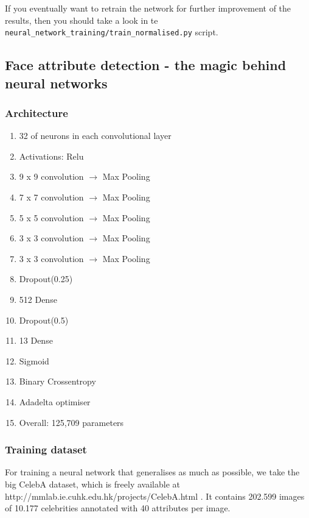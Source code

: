 \documentclass[12.5pt]{scrartcl}
\begin{document}
	If you eventually want to retrain the network for further improvement of the results, then you should take a look in te \texttt{neural\_network\_training/train\_normalised.py} script.
	\subsection{Face attribute detection - the magic behind neural networks}
	\subsubsection{Architecture}
	\begin{enumerate}
		\item 	32 of neurons in each convolutional layer
		\item Activations: Relu
		\item 9 x 9 convolution $\rightarrow$ Max Pooling
		\item	7 x 7 convolution $\rightarrow$  Max Pooling
		\item	5 x 5 convolution $\rightarrow$  Max Pooling
		\item	3 x 3 convolution $\rightarrow$  Max Pooling
		\item	3 x 3 convolution $\rightarrow$  Max Pooling
		\item	Dropout(0.25)
		\item	512 Dense
		\item	Dropout(0.5)
		\item	13 Dense
		\item	Sigmoid
		\item	Binary Crossentropy
		\item	Adadelta optimiser
		\item Overall: 125,709 parameters
	\end{enumerate}
	\subsubsection{Training dataset}
	For training a neural network that generalises as much as possible, we take the big CelebA dataset, which is freely available at http://mmlab.ie.cuhk.edu.hk/projects/CelebA.html . It contains 202.599 images of 10.177 celebrities annotated with 40 attributes per image.
\end{document}
